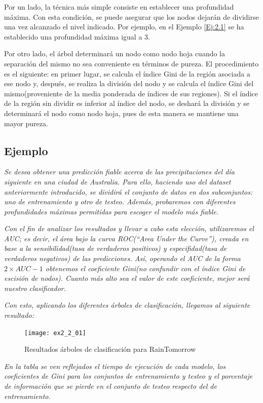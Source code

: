 \documentclass[12pt,twoside]{article}
\begin{document}
Por un lado, la técnica más simple consiste en establecer una profundidad máxima. Con esta condición, se puede asegurar que los nodos dejarán de dividirse una vez alcanzado el nivel indicado. Por ejemplo, en el Ejemplo \ref{Ej:2.1} se ha establecido una profundidad máxima igual a 3.

Por otro lado, el árbol determinará un nodo como nodo hoja cuando la separación del mismo no sea conveniente en términos de pureza. El procedimiento es el siguiente: en primer lugar, se calcula el índice Gini de la región asociada a ese nodo y, después, se realiza la división del nodo y se calcula el índice Gini del mismo(proveniente de la media ponderada de índices de sus regiones). Si el índice de la región sin dividir es inferior al índice del nodo, se deshará la división y se determinará el nodo como nodo hoja, pues de esta manera se mantiene una mayor pureza.





\subsection{Ejemplo} \label{ex:CART}
\emph{Se desea obtener una predicción fiable acerca de las precipitaciones del día siguiente en una ciudad de Australia. Para ello, haciendo uso del dataset anteriormente introducido, se dividirá el conjunto de datos en dos subconjuntos: uno de entrenamiento y otro de testeo. Además, probaremos con diferentes profundidades máximas permitidas para escoger el modelo más fiable.}

\emph{Con el fin de analizar los resultados y llevar a cabo esta elección, utilizaremos el AUC; es decir, el área bajo la curva ROC(``Area Under the Curve''), creada en base a la sensibilidad(tasa de  verdaderos positivos) y especifidad(tasa de verdaderos negativos) de las predicciones. Así, operando el AUC de la forma $2 \times AUC - 1$ obtenemos el coeficiente Gini(no confundir con el índice Gini de escisión de nodos). Cuanto más alto sea el valor de este coeficiente, mejor será nuestro clasificador.}

\emph{Con esto, aplicando los diferentes árboles de clasificación, llegamos al siguiente resultado:}

\begin{figure}[h]
\centering
\texttt{[image: ex2\_2\_01]}
\caption{Resultados árboles de clasificación para RainTomorrow}
\end{figure}

\emph{En la tabla se ven reflejados el tiempo de ejecución de cada modelo, los coeficientes de Gini para los conjuntos de entrenamiento y testeo y el porcentaje de información que se pierde en el conjunto de testeo respecto del de entrenamiento.}
\end{document}
